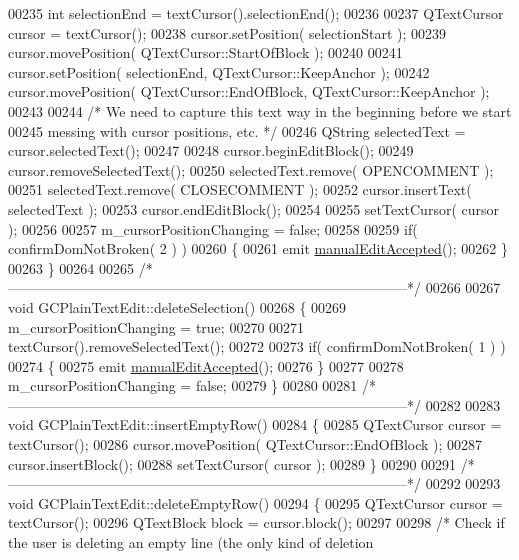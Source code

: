 \begin{DoxyCode}
00235   \textcolor{keywordtype}{int} selectionEnd = textCursor().selectionEnd();
00236 
00237   QTextCursor cursor = textCursor();
00238   cursor.setPosition( selectionStart );
00239   cursor.movePosition( QTextCursor::StartOfBlock );
00240 
00241   cursor.setPosition( selectionEnd, QTextCursor::KeepAnchor );
00242   cursor.movePosition( QTextCursor::EndOfBlock, QTextCursor::KeepAnchor  );
00243 
00244   \textcolor{comment}{/* We need to capture this text way in the beginning before we start}
00245 \textcolor{comment}{    messing with cursor positions, etc. */}
00246   QString selectedText = cursor.selectedText();
00247 
00248   cursor.beginEditBlock();
00249   cursor.removeSelectedText();
00250   selectedText.remove( OPENCOMMENT );
00251   selectedText.remove( CLOSECOMMENT );
00252   cursor.insertText( selectedText );
00253   cursor.endEditBlock();
00254 
00255   setTextCursor( cursor );
00256 
00257   m\_cursorPositionChanging = \textcolor{keyword}{false};
00258 
00259   \textcolor{keywordflow}{if}( confirmDomNotBroken( 2 ) )
00260   \{
00261     emit \hyperlink{class_g_c_plain_text_edit_a1c4c9e285ce6803e23637b725cda37ea}{manualEditAccepted}();
00262   \}
00263 \}
00264 
00265 \textcolor{comment}{/*
      --------------------------------------------------------------------------------------*/}
00266 
00267 \textcolor{keywordtype}{void} GCPlainTextEdit::deleteSelection()
00268 \{
00269   m\_cursorPositionChanging = \textcolor{keyword}{true};
00270 
00271   textCursor().removeSelectedText();
00272 
00273   \textcolor{keywordflow}{if}( confirmDomNotBroken( 1 ) )
00274   \{
00275     emit \hyperlink{class_g_c_plain_text_edit_a1c4c9e285ce6803e23637b725cda37ea}{manualEditAccepted}();
00276   \}
00277 
00278   m\_cursorPositionChanging = \textcolor{keyword}{false};
00279 \}
00280 
00281 \textcolor{comment}{/*
      --------------------------------------------------------------------------------------*/}
00282 
00283 \textcolor{keywordtype}{void} GCPlainTextEdit::insertEmptyRow()
00284 \{
00285   QTextCursor cursor = textCursor();
00286   cursor.movePosition( QTextCursor::EndOfBlock );
00287   cursor.insertBlock();
00288   setTextCursor( cursor );
00289 \}
00290 
00291 \textcolor{comment}{/*
      --------------------------------------------------------------------------------------*/}
00292 
00293 \textcolor{keywordtype}{void} GCPlainTextEdit::deleteEmptyRow()
00294 \{
00295   QTextCursor cursor = textCursor();
00296   QTextBlock block = cursor.block();
00297 
00298   \textcolor{comment}{/* Check if the user is deleting an empty line (the only kind of deletion}

\end{DoxyCode}
